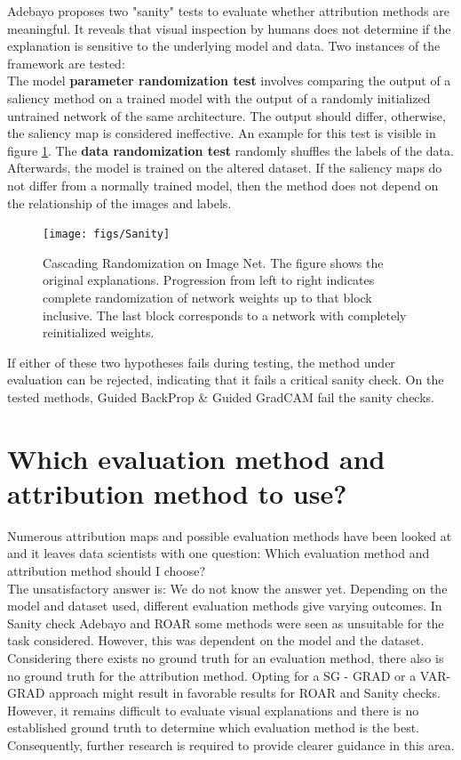 Adebayo \cite{adebayo2020sanity} proposes two "sanity" tests to evaluate whether attribution methods are meaningful. It reveals that visual inspection by humans does not determine if the explanation is sensitive to the underlying model and data. Two instances of the framework are tested:
\\
The model \textbf{parameter randomization test} involves comparing the output of a saliency method on a trained model with the output of a randomly initialized untrained network of the same architecture. The output should differ, otherwise, the saliency map is considered ineffective. An example for this test is visible in figure \ref{fig:Sanity}. The \textbf{data randomization test} randomly shuffles the labels of the data. Afterwards, the model is trained on the altered   dataset. If the saliency maps do not differ from a normally trained model, then the method does not depend on the relationship of the images and labels.\\
\begin{figure}[H]
	\centering
	\texttt{[image: figs/Sanity]}
	\caption[Cascading Randomization on Image Net\cite{adebayo2020sanity}]{Cascading Randomization on Image Net. The figure shows the original explanations. Progression from left to right indicates complete randomization of network weights up to that block inclusive. The last block corresponds to a network with completely reinitialized weights. }
	\label{fig:Sanity}
\end{figure}
If either of these two hypotheses fails during testing, the method under evaluation can be rejected, indicating that it fails a critical sanity check. On the tested methods, Guided BackProp \& Guided GradCAM fail the sanity checks.


\chapter{Which evaluation method and attribution method to use?}
\label{sec:summary}
Numerous attribution maps and possible evaluation methods have been looked at and it leaves data scientists with one question: Which evaluation method and attribution method should I choose?
\\
The unsatisfactory answer is: We do not know the answer yet. Depending on the model and   dataset used, different evaluation methods give varying outcomes. In Sanity check Adebayo \cite{adebayo2020sanity} and ROAR\cite{hooker2019benchmark} some methods were seen as unsuitable for the task considered. However, this was dependent on the model and the dataset. Considering there exists no ground truth for an evaluation method, there also is no ground truth for the attribution method. Opting for a SG - GRAD or a VAR-GRAD approach might result in favorable results for ROAR and Sanity checks. However, it remains difficult to evaluate visual explanations and there is no established ground truth to determine which evaluation method is the best. Consequently, further research is required to provide clearer guidance in this area.


